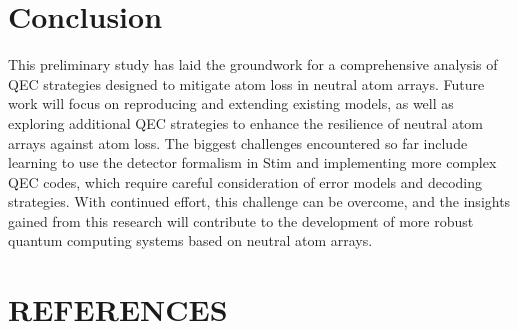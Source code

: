 \documentclass[aps,prb,twocolumn,superscriptaddress,nobibnotes]{revtex4-2} %
\begin{document}
\section{Conclusion}
This preliminary study has laid the groundwork for a comprehensive analysis of QEC strategies designed to mitigate atom loss in neutral atom arrays.
Future work will focus on reproducing and extending existing models, as well as exploring additional QEC strategies to enhance the resilience of neutral atom arrays against atom loss.
The biggest challenges encountered so far include learning to use the detector formalism in Stim and implementing more complex QEC codes, which require careful consideration of error models and decoding strategies.
With continued effort, this challenge can be overcome, and the insights gained from this research will contribute to the development of more robust quantum computing systems based on neutral atom arrays.

\section*{REFERENCES}
\makeatletter
\let\pre@bibdata\@empty
\makeatother
 
\end{document}
